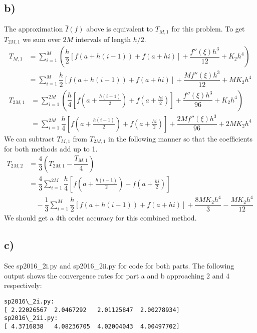\documentclass[12pt]{article}
\begin{document}
\subsection*{b)}
The approximation $\hat{I}(f)$ above is equivalent to $T_{M,1}$ for this
problem. To get $T_{2M,1}$ we sum over $2M$ intervals of length $h/2$.
\begin{equation*}
\begin{split}
T_{M,1} &= \sum_{i=1}^{M} \left( \dfrac{h}{2} \left[f(a+h(i-1)) + f(a+hi)\right]
+ \dfrac{f''(\xi)h^3}{12} + K_2h^4 \right) \\
&= \sum_{i=1}^{M} \dfrac{h}{2} \left[f(a+h(i-1)) + f(a+hi)\right] +
\dfrac{Mf''(\xi)h^3}{12} + MK_2h^4
\end{split}
\end{equation*}
\begin{equation*}
\begin{split}
T_{2M,1} &= \sum_{i=1}^{2M} \left( \dfrac{h}{4} \left[f(a+\frac{h(i-1)}{2}) +
f(a+\frac{hi}{2})\right] + \dfrac{f''(\xi)h^3}{96} + K_2h^4 \right) \\
&= \sum_{i=1}^{2M} \dfrac{h}{4} \left[f(a+\frac{h(i-1)}{2}) +
f(a+\frac{hi}{2})\right] + \dfrac{2Mf''(\xi)h^3}{96} + 2MK_2h^4
\end{split}
\end{equation*}
We can subtract $T_{M,1}$ from $T_{2M,1}$ in the following manner so that the
coefficients for both methods add up to 1.
\begin{equation*}
\begin{split}
T_{2M,2} &= \dfrac{4}{3} \left( T_{2M,1}-\dfrac{T_{M,1}}{4} \right) \\
&= \dfrac{4}{3} \sum_{i=1}^{2M} \dfrac{h}{4} \left[f(a+\frac{h(i-1)}{2}) +
f(a+\frac{hi}{2})\right] \\ &\hspace{1em} - \dfrac{1}{3} \sum_{i=1}^{M}
    \dfrac{h}{2} \left[f(a+h(i-1)) + f(a+hi)\right] + \dfrac{8MK_2h^4}{3} -
    \dfrac{MK_2h^4}{12}
\end{split}
\end{equation*}
We should get a 4th order accuracy for this combined method.

\subsection*{c)}
See sp2016\_2i.py and sp2016\_2ii.py for code for both parts.
The following output shows the convergence rates for part a and b approaching 2 and 4 respectively:
\begin{lstlisting}
sp2016\_2i.py:
[ 2.22026567  2.0467292   2.01125847  2.00278934]
sp2016\_2ii.py:
[ 4.3716838   4.08236705  4.02004043  4.00497702]
\end{lstlisting}
\end{document}
